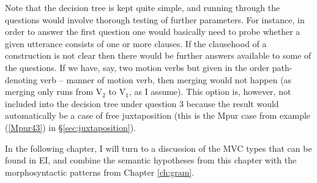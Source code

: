 Note that the decision tree is kept quite simple, and running through the questions would involve thorough testing of further parameters. For instance, in order to answer the first question one would basically need to probe whether a given utterance consists of one or more clauses. If the clausehood of a construction is not clear then there would be further answers available to some of the questions. If we have, say, two motion verbs but given in the order path-denoting verb -- manner of motion verb, then merging would not happen (as merging only runs from V$_2$ to V$_1$, as I assume). This option is, however, not included into the decision tree under question 3 because the result would automatically be a case of free juxtaposition (this is the Mpur case from example (\ref{Mpur43}) in §\ref{sec:juxtaposition}).

In the following chapter, I will turn to a discussion of the MVC types that can be found in EI, and combine the semantic hypotheses from this chapter with the morphosyntactic patterns from Chapter \ref{ch:gram}.
